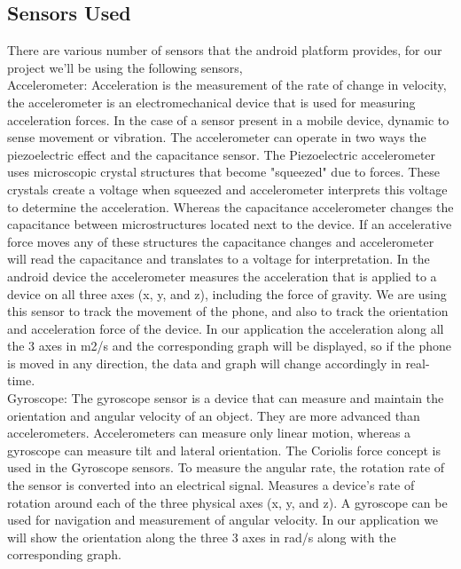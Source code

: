 \documentclass[conference]{IEEEtran}
\begin{document}
\subsection{Sensors Used}
There are various number of sensors that the android platform provides, for our project we'll be using the following sensors,\\
Accelerometer: Acceleration is the measurement of the rate of change in velocity, the accelerometer is an electromechanical device that is used for measuring acceleration forces. In the case of a sensor present in a mobile device, dynamic to sense movement or vibration. The accelerometer can operate in two ways the piezoelectric effect and the capacitance sensor. The Piezoelectric accelerometer uses microscopic crystal structures that become "squeezed" due to forces. These crystals create a voltage when squeezed and accelerometer interprets this voltage to determine the acceleration. Whereas the capacitance accelerometer changes the capacitance between microstructures located next to the device. If an accelerative force moves any of these structures the capacitance changes and accelerometer will read the capacitance and translates to a voltage for interpretation. In the android device the accelerometer measures the acceleration that is applied to a device on all three axes (x, y, and z), including the force of gravity. We are using this sensor to track the movement of the phone, and also to track the orientation and acceleration force of the device. In our application the acceleration along all the 3 axes in m2/s and the corresponding graph will be displayed, so if the phone is moved in any direction, the data and graph will change accordingly in real-time.\\
Gyroscope: The gyroscope sensor is a device that can measure and maintain the orientation and angular velocity of an object. They are more advanced than accelerometers. Accelerometers can measure only linear motion, whereas a gyroscope can measure tilt and lateral orientation. The Coriolis force concept is used in the Gyroscope sensors. To measure the angular rate, the rotation rate of the sensor is converted into an electrical signal. Measures a device's rate of rotation around each of the three physical axes (x, y, and z). A gyroscope can be used for navigation and measurement of angular velocity. In our application we will show the orientation along the three 3 axes in rad/s along with the corresponding graph.
\end{document}
